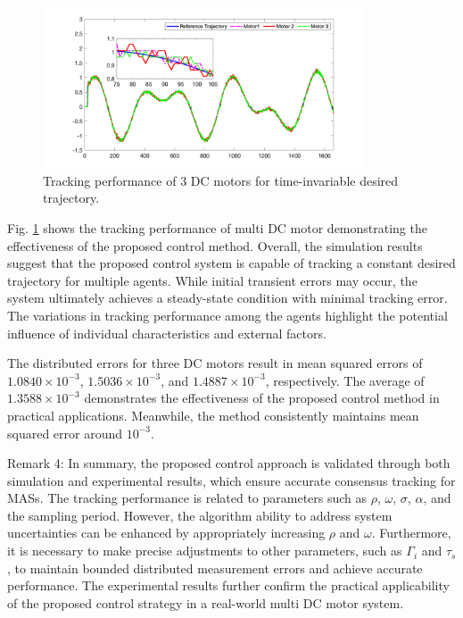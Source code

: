 \documentclass[journal,onecolumn]{IEEEtran}
\begin{document}
\begin{figure}[H]
    \centering
    \includegraphics[width=0.85\textwidth]{dataplot.png}
    \caption{Tracking performance of 3 DC motors for time-invariable desired trajectory.}
    \label{fig:output} %
\end{figure}

Fig. \ref{fig:output} shows the tracking performance of multi DC motor demonstrating the effectiveness of the proposed control method.
Overall, the simulation results suggest that the proposed control system is capable of tracking a constant desired trajectory for multiple agents. While initial transient errors may occur, the system ultimately achieves a steady-state condition with minimal tracking error. The variations in tracking performance among the agents highlight the potential influence of individual characteristics and external factors.

The distributed errors for three DC motors result in mean squared errors of \(1.0840 \times 10^{-3}\), \(1.5036 \times 10^{-3}\), and \(1.4887 \times 10^{-3}\), respectively. The average of \(1.3588 \times 10^{-3}\) demonstrates the effectiveness of the proposed control method in practical applications. Meanwhile, the method consistently maintains mean squared error around \(10^{-3}\).

Remark 4: In summary, the proposed control approach is validated through both simulation and experimental results, which ensure accurate consensus tracking for MASs. The tracking performance is related to parameters such as $\rho$, $\omega$, $\sigma$, $\alpha$, and the sampling period. However, the algorithm ability to address system uncertainties can be enhanced by appropriately increasing $\rho$ and $\omega$. Furthermore, it is necessary to make precise adjustments to other parameters, such as $\Gamma_i$ and $\tau_s$, to maintain bounded distributed measurement errors and achieve accurate performance. The experimental results further confirm the practical applicability of the proposed control strategy in a real-world multi DC motor system.
\end{document}
